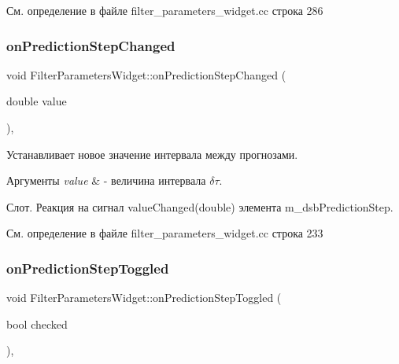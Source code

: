 См. определение в файле filter\+\_\+parameters\+\_\+widget.\+cc строка 286

\hypertarget{class_filter_parameters_widget_aa78cbb97c3a70babc20c35cf0e6f346a}{}\label{class_filter_parameters_widget_aa78cbb97c3a70babc20c35cf0e6f346a} 
\subsubsection{\texorpdfstring{on\+Prediction\+Step\+Changed}{onPredictionStepChanged}}
{\footnotesize\ttfamily void Filter\+Parameters\+Widget\+::on\+Prediction\+Step\+Changed (\begin{DoxyParamCaption}\item[{double}]{value }\end{DoxyParamCaption})\hspace{0.3cm}{\ttfamily [private]}, {\ttfamily [slot]}}



Устанавливает новое значение интервала между прогнозами. 


\begin{DoxyParams}{Аргументы}
{\em value} & -\/ величина интервала $\delta \tau$.\\
\hline
\end{DoxyParams}
Слот. Реакция на сигнал value\+Changed(double) элемента m\+\_\+dsb\+Prediction\+Step. 

См. определение в файле filter\+\_\+parameters\+\_\+widget.\+cc строка 233

\hypertarget{class_filter_parameters_widget_aa5168232b5731eafd599c451fd9a54f9}{}\label{class_filter_parameters_widget_aa5168232b5731eafd599c451fd9a54f9} 
\subsubsection{\texorpdfstring{on\+Prediction\+Step\+Toggled}{onPredictionStepToggled}}
{\footnotesize\ttfamily void Filter\+Parameters\+Widget\+::on\+Prediction\+Step\+Toggled (\begin{DoxyParamCaption}\item[{bool}]{checked }\end{DoxyParamCaption})\hspace{0.3cm}{\ttfamily [private]}, {\ttfamily [slot]}}



